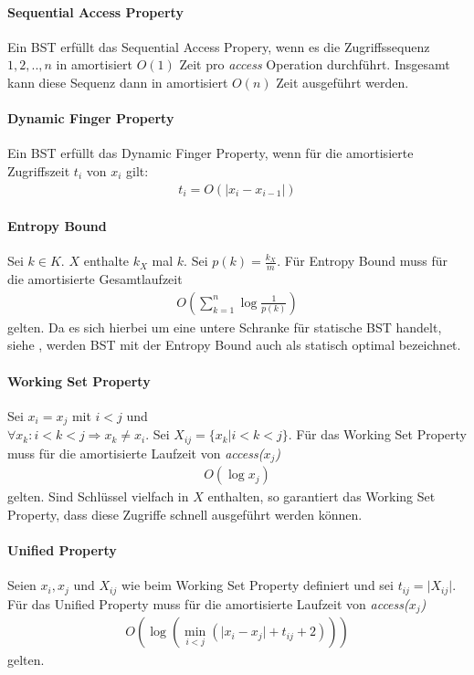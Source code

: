 \documentclass[a4paper,12pt]{article}
\begin{document}
\paragraph{Sequential Access Property}
Ein BST erfüllt das Sequential Access Propery, wenn es die Zugriffssequenz $1,2,..,n$ in amortisiert $O(1)$ Zeit pro \textit{access} Operation durchführt. Insgesamt kann diese Sequenz dann in amortisiert  $O(n)$ Zeit ausgeführt werden.

\paragraph{Dynamic Finger Property}
Ein BST erfüllt das Dynamic Finger Property, wenn für die amortisierte Zugriffszeit $t_i$ von $x_i$ gilt: 
\begin{align*}
t_i = O\left(\vert x_i - x_{i-1} \vert \right)
\end{align*} 


\paragraph{Entropy Bound}
Sei $k \in K$. $X$ enthalte $k_X$ mal $k$. Sei $p(k) = \frac {k_X}{m}$. Für Entropy Bound muss für die amortisierte Gesamtlaufzeit 
\begin{align*}
O\left(\sum_{k = 1}^{n} \log  \frac{1}{p(k)} \right) 
\end{align*}
gelten. Da es sich hierbei um eine untere Schranke für statische BST handelt, siehe \cite{staticOptimal}, werden BST mit der Entropy Bound auch als statisch optimal bezeichnet.  


\paragraph{Working Set Property}
Sei $x_i = x_j$ mit $i < j$ und \\ 
$\forall x_k \colon i < k < j \Rightarrow x_k \neq x_i$. Sei  $X_{ij} = \{x_k \vert i < k < j\}$.  Für das Working Set Property muss für die amortisierte Laufzeit von \textit{ access($x_j$) }
\begin{align*}
O\left(\log x_j\right)
\end{align*} 
gelten. Sind Schlüssel vielfach in $X$ enthalten, so garantiert das Working Set Property, dass diese Zugriffe schnell ausgeführt werden können. 

\paragraph{Unified Property}
Seien $x_i, x_j$ und $X_{ij}$ wie beim Working Set Property definiert und sei $t_{ij} =\vert X_{ij}\vert$. Für das Unified Property muss für die amortisierte Laufzeit von \textit{ access($x_j$) }  
\begin{align*}
O \left(\log \left( \min_{i < j} \left(\vert x_i - x_j \vert + t_{ij} + 2   \right)\right)\right)
\end{align*} 
gelten.
\newpage


\end{document}
